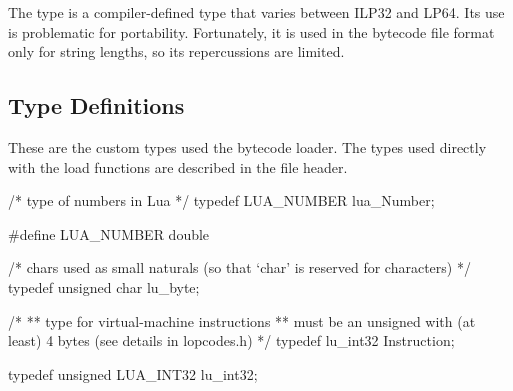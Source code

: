 	The  type is a compiler-defined type that varies
	between ILP32 and LP64.  Its use is problematic for portability.
	Fortunately, it is used in the bytecode file format only for string
	lengths, so its repercussions are limited.

\subsection{Type Definitions}

	These are the custom types used the bytecode loader.  The types used
	directly with the load functions are described in the file header.


\begin{LuaCCode}[caption=Definition of \keyword{lua\_Number} from \filename{lua.h}]
/* type of numbers in Lua */
typedef LUA_NUMBER lua_Number;
\end{LuaCCode}


\begin{LuaCCode}[caption=Definition of \keyword{LUA\_NUMBER} from \filename{luaconf.h}]
#define LUA_NUMBER	double
\end{LuaCCode}


\begin{LuaCCode}[caption=Definition of \keyword{lu\_byte} from \filename{llimits.h}]
/* chars used as small naturals (so that `char' is reserved for characters) */
typedef unsigned char lu_byte;
\end{LuaCCode}


\begin{LuaCCode}[caption=Definition of \keyword{Instruction} from \filename{llimits.h}]
/*
** type for virtual-machine instructions
** must be an unsigned with (at least) 4 bytes (see details in lopcodes.h)
*/
typedef lu_int32 Instruction;
\end{LuaCCode}


\begin{LuaCCode}[caption=Definition of \keyword{lu\_int32} from \filename{llimits.h}]
typedef unsigned LUA_INT32 lu_int32;
\end{LuaCCode}

